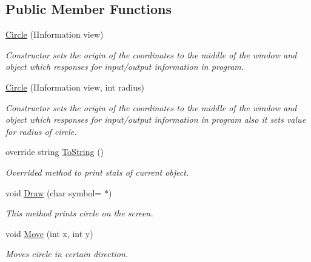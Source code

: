 \subsection*{Public Member Functions}
\begin{DoxyCompactItemize}
\item 
\mbox{\hyperlink{class_home_work_1_1_task_library_1_1_tasks_1_1_lesson6_1_1_task2_1_1_classes_1_1_circle_a11decfea1be71225318df9104f997019}{Circle}} (I\+Information view)
\begin{DoxyCompactList}\small\item\em Constructor sets the origin of the coordinates to the middle of the window and object which responses for input/output information in program. \end{DoxyCompactList}\item 
\mbox{\hyperlink{class_home_work_1_1_task_library_1_1_tasks_1_1_lesson6_1_1_task2_1_1_classes_1_1_circle_a6417adac262a4c64223d928213bc4742}{Circle}} (I\+Information view, int radius)
\begin{DoxyCompactList}\small\item\em Constructor sets the origin of the coordinates to the middle of the window and object which responses for input/output information in program also it sets value for radius of circle. \end{DoxyCompactList}\item 
override string \mbox{\hyperlink{class_home_work_1_1_task_library_1_1_tasks_1_1_lesson6_1_1_task2_1_1_classes_1_1_circle_a5ee66f1e8237be31374d570a19c7acdd}{To\+String}} ()
\begin{DoxyCompactList}\small\item\em Overrided method to print stats of current object. \end{DoxyCompactList}\item 
void \mbox{\hyperlink{class_home_work_1_1_task_library_1_1_tasks_1_1_lesson6_1_1_task2_1_1_classes_1_1_circle_abaa706e9da35ccbbec897327cdf8bbee}{Draw}} (char symbol=\textquotesingle{} $\ast$\textquotesingle{})
\begin{DoxyCompactList}\small\item\em This method prints circle on the screen. \end{DoxyCompactList}\item 
void \mbox{\hyperlink{class_home_work_1_1_task_library_1_1_tasks_1_1_lesson6_1_1_task2_1_1_classes_1_1_circle_aa133b87121d3a40da2612a9e72a3c0f4}{Move}} (int x, int y)
\begin{DoxyCompactList}\small\item\em Moves circle in certain direction. \end{DoxyCompactList}\item 

\end{DoxyCompactItemize}
